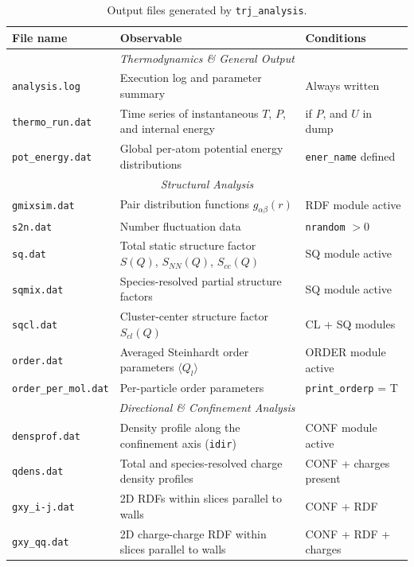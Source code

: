 \documentclass[final,1p,times]{elsarticle}
\begin{document}
\begingroup
\footnotesize
\setlength{\tabcolsep}{3pt}
\begin{longtable}{p{}p{}p{}}
\caption{Output files generated by \texttt{trj\_analysis}.}\label{tab:trj_output_files}\\
\toprule
File name & Observable & Conditions \\
\midrule
\multicolumn{3}{c}{\textit{Thermodynamics \& General Output}} \\
\midrule
\texttt{analysis.log} & Execution log and parameter summary & Always written \\
\texttt{thermo\_run.dat} & Time series of instantaneous $T$, $P$, and
                           internal energy & if $P$, and $U$ in dump \\
\texttt{pot\_energy.dat} & Global per-atom potential energy distributions & \texttt{ener\_name} defined \\
\midrule
\multicolumn{3}{c}{\textit{Structural Analysis}} \\
\midrule
\texttt{gmixsim.dat} & Pair distribution functions $g_{\alpha\beta}(r)$ & RDF module active \\
\texttt{s2n.dat} & Number fluctuation data & \texttt{nrandom} $> 0$ \\
\texttt{sq.dat} & Total static structure factor $S(Q)$, $S_{NN}(Q)$, $S_{cc}(Q)$ & SQ module active \\
\texttt{sqmix.dat} & Species-resolved partial structure factors & SQ module active \\
\texttt{sqcl.dat} & Cluster-center structure factor $S_{cl}(Q)$ & CL + SQ modules \\
\texttt{order.dat} & Averaged Steinhardt order parameters $\langle Q_l \rangle$ & ORDER module active \\
\texttt{order\_per\_mol.dat} & Per-particle order parameters & \texttt{print\_orderp} = T \\
\midrule
\multicolumn{3}{c}{\textit{Directional \& Confinement Analysis}} \\
\midrule
\texttt{densprof.dat} & Density profile along the confinement axis (\texttt{idir}) & CONF module active \\
\texttt{qdens.dat} & Total and species-resolved charge density profiles & CONF + charges present \\
\texttt{gxy\_i-j.dat} & 2D RDFs within slices parallel to walls & CONF + RDF \\
\texttt{gxy\_qq.dat} & 2D charge-charge RDF within slices parallel to walls & CONF + RDF + charges \\

\end{longtable}
\end{document}
